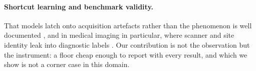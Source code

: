 \paragraph{Shortcut learning and benchmark validity.} That models latch onto acquisition artefacts
rather than the phenomenon is well documented \citep{geirhos2020shortcut}, and in medical imaging
in particular, where scanner and site identity leak into diagnostic labels
\citep{degrave2021shortcut}. Our contribution is not the observation but the instrument: a floor
cheap enough to report with every result, and which we show is not a corner case in this domain.
